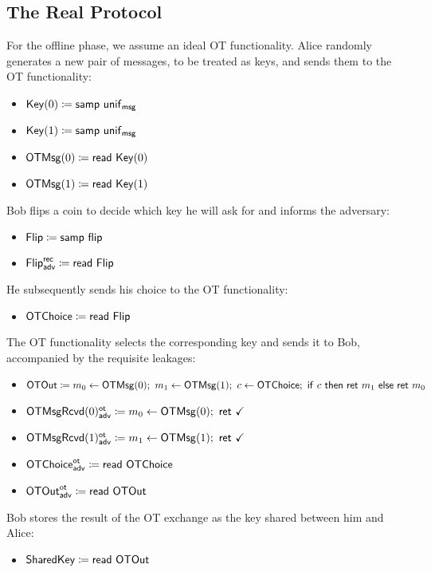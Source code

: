 \subsection{The Real Protocol}
For the offline phase, we assume an ideal OT functionality. Alice randomly generates a new pair of messages, to be treated as keys, and sends them to the OT functionality:
\begin{itemize}
\item $\mathsf{Key}(0) \coloneqq \mathsf{samp} \ \mathsf{unif}_{\mathsf{msg}}$
\item $\mathsf{Key}(1) \coloneqq \mathsf{samp} \ \mathsf{unif}_{\mathsf{msg}}$
\item $\mathsf{OTMsg}(0) \coloneqq \mathsf{read} \ \mathsf{Key}(0)$
\item $\mathsf{OTMsg}(1) \coloneqq \mathsf{read} \ \mathsf{Key}(1)$
\end{itemize}
Bob flips a coin to decide which key he will ask for and informs the adversary:
\begin{itemize}
\item $\mathsf{Flip} \coloneqq \mathsf{samp} \ \mathsf{flip}$
\item {\color{blue} $\mathsf{Flip}^{\mathsf{rec}}_{\mathsf{adv}} \coloneqq \mathsf{read} \ \mathsf{Flip}$}
\end{itemize}
He subsequently sends his choice to the OT functionality:
\begin{itemize}
\item $\mathsf{OTChoice} \coloneqq \mathsf{read} \ \mathsf{Flip}$
\end{itemize}
The OT functionality selects the corresponding key and sends it to Bob, accompanied by the requisite leakages:
\begin{itemize}
\item $\OTOut \coloneqq m_0 \leftarrow \OTMsg(0); \ m_1 \leftarrow \OTMsg(1); \ c \leftarrow \OTChoice; \ \ifte{c}{\ret{m_1}}{\ret{m_0}}$
\item {\color{blue} $\LeakOTMsgRcvd(0)^\ot_\adv \coloneqq m_0 \leftarrow \OTMsg(0); \ \ret{\checkmark}$}
\item {\color{blue} $\LeakOTMsgRcvd(1)^\ot_\adv \coloneqq m_1 \leftarrow \OTMsg(1); \ \ret{\checkmark}$}
\item {\color{blue} $\mathsf{OTChoice}^{\mathsf{ot}}_{\mathsf{adv}} \coloneqq \mathsf{read} \ \mathsf{OTChoice}$}
\item {\color{blue} $\mathsf{OTOut}^{\mathsf{ot}}_{\mathsf{adv}} \coloneqq \mathsf{read} \ \mathsf{OTOut}$}
\end{itemize}
Bob stores the result of the OT exchange as the key shared between him and Alice:
\begin{itemize}
\item $\mathsf{SharedKey} \coloneqq \mathsf{read} \ \mathsf{OTOut}$
\end{itemize}
